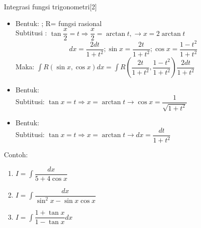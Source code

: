 \documentclass{beamer}
\begin{document}
\begin{frame}[t, fragile]{Integrasi fungsi trigonometri[2]}
\begin{itemize}
\item Bentuk: ; R= fungsi rasional \\
\vskip3pt Subtitusi : $\tan\dfrac{x}{2}=t \Longrightarrow \dfrac{x}{2} = \arctan {t}, \rightarrow x= 2 \arctan{t}$\\
$$dx=\dfrac{2dt}{1+t^2}; \sin{x}=\dfrac{2t}{1+t^2}; \cos{x}=\dfrac{1-t^2}{1+t^2}$$
Maka: $\int R (\sin x, \cos x) dx = \int R (\dfrac{2t}{1+t^2}, \dfrac{1-t^2}{1+t^2})\dfrac{2dt}{1+t^2}$
\item Bentuk:  \\
\vskip5pt Subtitusi: $\tan{x} = t \Longrightarrow x=\arctan{t} \rightarrow \cos{x}=\dfrac{1}{\sqrt{1+t^2}}$
\item Bentuk: \\
Subtitusi: $\tan {x} = t \Longrightarrow x=\arctan{t} \rightarrow dx = \dfrac{dt}{1+t^2}$
\end{itemize}
\end{frame}

\begin{frame}[t,fragile]{Contoh:}
\begin{enumerate}
\item $I=\int \dfrac{dx}{5+4\cos{x}}$
\item $I=\int \dfrac{dx}{\sin^2x-\sin x \cos x}$
\item $I=\int \dfrac{1+\tan{x}}{1-\tan{x}}dx$
\end{enumerate}
\end{frame}

\end{document}
